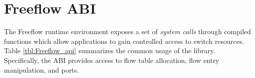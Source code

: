 

\section{Freeflow ABI} \label{fp:dp_interface}

The Freeflow runtime environment exposes a set of \emph{system calls} through compiled functions which allow applications to gain controlled access to switch resources. Table \ref{tbl:Freeflow_api} summarizes the common usage of the library.
Specifically, the ABI provides access to flow table allocation, flow entry manipulation, and ports.

